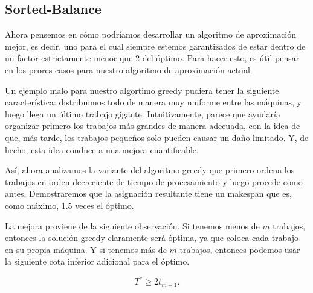 \documentclass{report}
\begin{document}
	\subsection*{Sorted-Balance}
	
	Ahora pensemos en cómo podríamos desarrollar un algoritmo de aproximación mejor, es decir, uno para el cual siempre estemos garantizados de estar dentro de un factor estrictamente menor que 2 del óptimo. Para hacer esto, es útil pensar en los peores casos para nuestro algoritmo de aproximación actual.
	
	Un ejemplo malo para nuestro algortimo greedy pudiera tener la siguiente característica: distribuimos todo de manera muy uniforme entre las máquinas, y luego llega un último trabajo gigante. Intuitivamente, parece que ayudaría organizar primero los trabajos más grandes de manera adecuada, con la idea de que, más tarde, los trabajos pequeños solo pueden causar un daño limitado. Y, de hecho, esta idea conduce a una mejora cuantificable.
	
	Así, ahora analizamos la variante del algoritmo greedy que primero ordena los trabajos en orden decreciente de tiempo de procesamiento y luego procede como antes. Demostraremos que la asignación resultante tiene un makespan que es, como máximo, 1.5 veces el óptimo.
	
	
	La mejora proviene de la siguiente observación. Si tenemos menos de \( m \) trabajos, entonces la solución greedy claramente será óptima, ya que coloca cada trabajo en su propia máquina. Y si tenemos más de \( m \) trabajos, entonces podemos usar la siguiente cota inferior adicional para el óptimo.
	
	\begin{equation} \label{lem:lower-bound}
	  T^* \geq 2t_{m+1} .
	  	\end{equation}
	
\end{document}
